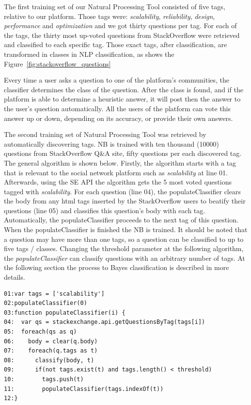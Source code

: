 The first training set of our Natural Processing Tool consisted of five tags, relative to our platform. Those tags were: \emph{scalability}, \emph{reliability}, \emph{design}, \emph{performance} and \emph{optimization} and we got thirty questions per tag. For each of the tags, the thirty most up-voted questions from StackOverflow were retrieved and classified to each specific tag. Those exact tags, after classification, are transformed in classes in NLP classification, as shows the Figure~\ref{fig:stackoverflow_questions}

Every time a user asks a question to one of the platform's communities, the classifier determines the class of the question. After the class is found, and if the platform is able to determine a heuristic answer, it will post then the answer to the user's question automatically. All the users of the platform can vote this answer up or down, depending on its accuracy, or provide their own answers.

The second training set of Natural Processing Tool was retrieved by automatically discovering tags. NB is trained with ten thousand (10000) questions from StackOverflow Q\&A site, fifty questions per each discovered tag. The general algorithm is shown below. Firstly, the algorithm starts with a tag that is relevant to the social network platform such as \emph{scalability} at line 01. Afterwards, using the SE API the algorithm gets the 5 most voted questions tagged with \emph{scalability}. For each question (line 04), the populateClassifier clears the body from any html tags inserted by the StackOverflow users to beatify their questions (line 05) and classifies this question's body with each tag. Automatically, the populateClassifier proceeds to the next tag of this question. When the populateClassifier is finished the NB is trained. It should be noted that a question may have more than one tags, so a question can be classified to up to five tags / classes. Changing the threshold parameter at the following algorithm, the \emph{populateClassifier} can classify questions with an arbitrary number of tags. At the following section the process to Bayes classification is described in more details.

\begin{lstlisting} 
01:var tags = ['scalability']
02:populateClassifier(0)
03:function populateClassifier(i) {
04:  var qs = stackexchange.api.getQuestionsByTag(tags[i])
05:  foreach(qs as q)
06:    body = clear(q.body)
07:    foreach(q.tags as t)
08:    	 classify(body, t)
09:    	 if(not tags.exist(t) and tags.length() < threshold)
10:    	   tags.push(t)	  
11:        populateClassifier(tags.indexOf(t))
12:}		
\end{lstlisting}

